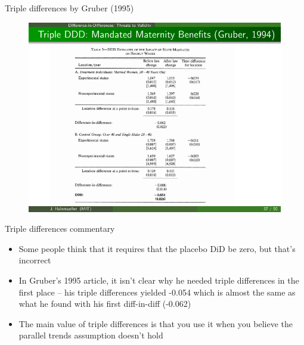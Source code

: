 \documentclass{beamer}
\begin{document}
\begin{frame}{Triple differences by Gruber (1995)}
	
	\begin{figure}
	\includegraphics{./lecture_includes/gruber_ddd_3.pdf}
	\end{figure}
	
\end{frame}

\begin{frame}{Triple differences commentary}

\begin{itemize}
\item Some people think that it requires that the placebo DiD be zero, but that's incorrect

\item In Gruber's 1995 article, it isn't clear why he needed triple differences in the first place -- his triple differences yielded -0.054 which is almost the same as what he found with his first diff-in-diff (-0.062)
\item The main value of triple differences is that you use it when you believe the parallel trends assumption doesn't hold

\end{itemize}

\end{frame}
\end{document}
